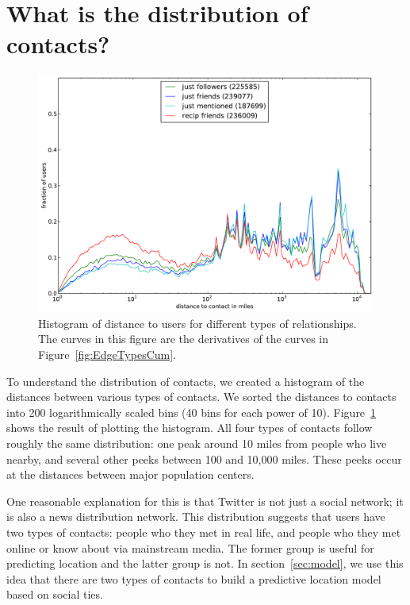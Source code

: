 \section{What is the distribution of contacts?}

\begin{figure}[tb]
\centering
\includegraphics[width=\linewidth]{figures/edge_types_norm.pdf}
\caption{
Histogram of distance to users for different types of relationships.
The curves in this figure are the derivatives of the curves in
Figure~\ref{fig:EdgeTypesCum}.
}
\label{fig:EdgeTypes}
\end{figure}

To understand the distribution of contacts, we created a histogram of the distances between various types of contacts.
We sorted the distances to contacts into 200 logarithmically
scaled bins (40 bins for each power of 10).
Figure~\ref{fig:EdgeTypes} shows the result of plotting the histogram.
%
All four types of contacts follow roughly the same
distribution: one peak around 10 miles from people who live nearby, and several
other peeks between 100 and 10,000 miles. These peeks occur at the distances
between major population centers.

One reasonable explanation for this is that Twitter is not just a social
network; it is also a news distribution network.  This distribution
suggests that users have two types of contacts: people who they met in
real life, and people who they met online or know about via mainstream media.
The former group is useful for predicting location and the latter group is not.
In section~\ref{sec:model}, we use this idea that there are two types of
contacts to build a predictive location model based on social ties.


